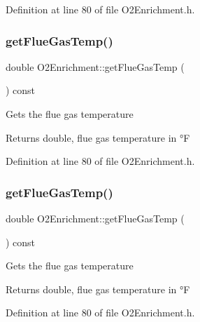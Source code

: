 Definition at line 80 of file O2\+Enrichment.\+h.

\mbox{\label{class_o2_enrichment_a53083756c50aaf89f755a132b62e999b}} 
\subsubsection{\texorpdfstring{get\+Flue\+Gas\+Temp()}{getFlueGasTemp()}\hspace{0.1cm}{\footnotesize\ttfamily [2/3]}}
{\footnotesize\ttfamily double O2\+Enrichment\+::get\+Flue\+Gas\+Temp (\begin{DoxyParamCaption}{ }\end{DoxyParamCaption}) const\hspace{0.3cm}{\ttfamily [inline]}}

Gets the flue gas temperature \begin{DoxyReturn}{Returns}
double, flue gas temperature in °F 
\end{DoxyReturn}


Definition at line 80 of file O2\+Enrichment.\+h.

\mbox{\label{class_o2_enrichment_a53083756c50aaf89f755a132b62e999b}} 
\subsubsection{\texorpdfstring{get\+Flue\+Gas\+Temp()}{getFlueGasTemp()}\hspace{0.1cm}{\footnotesize\ttfamily [3/3]}}
{\footnotesize\ttfamily double O2\+Enrichment\+::get\+Flue\+Gas\+Temp (\begin{DoxyParamCaption}{ }\end{DoxyParamCaption}) const\hspace{0.3cm}{\ttfamily [inline]}}

Gets the flue gas temperature \begin{DoxyReturn}{Returns}
double, flue gas temperature in °F 
\end{DoxyReturn}


Definition at line 80 of file O2\+Enrichment.\+h.

